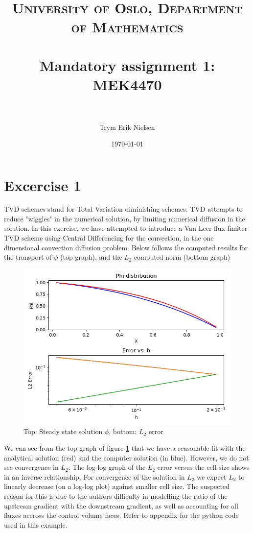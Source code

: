 \documentclass[paper=a4, fontsize=11pt]{article} %
\title{	
    \normalfont \normalsize 
    \textsc{University of Oslo, Department of Mathematics} \\ [25pt] %
    \horrule{0.5pt} \\[0.4cm] %
    \huge Mandatory assignment 1: MEK4470 \\ %
    \horrule{0.5pt} \\[0.5cm] %
    }
\author{Trym Erik Nielsen} %
\date{\normalsize\today} %
\numberwithin{equation}{section} %
\numberwithin{figure}{section} %
\numberwithin{table}{section} %
\begin{document}
    \lstset{language=Python}
    
    \maketitle %
    
    
    \section*{Excercise 1}
    TVD schemes stand for Total Variation diminishing schemes. TVD attempts to reduce "wiggles" in the numerical solution, by limiting numerical diffusion in the solution. In this exercise, we have attempted to introduce a Van-Leer flux limiter TVD scheme using Central Differencing for the convection, in the one dimensional convection diffusion problem. Below follows the computed results for the transport of $\phi$ (top graph), and the $L_2$ computed norm (bottom graph)

    \begin{figure}[h!]
        \centering
        \includegraphics[width=0.6\linewidth]{Figures/ConvectionDiffusion}
        \caption{Top: Steady state solution $\phi$, bottom: $L_2$ error}
        \label{fig:ConvDiff}
    \end{figure}        

    We can see from the top graph of figure \ref{fig:ConvDiff} that we have a reasonable fit with the analytical solution (red) and the computer solution (in blue). However, we do not see convergence in $L_2$. The log-log graph of the $L_2$ error versus the cell size shows in an inverse relationship. For convergence of the solution in $L_2$ we expect $L_2$ to linearly decrease (on a log-log plot) against smaller cell size. The suspected reason for this is due to the authors difficulty in modelling the ratio of the upstream gradient with the downstream gradient, as well as accounting for all fluxes accross the control volume faces. Refer to appendix for the python code used in this example.  
\end{document}
